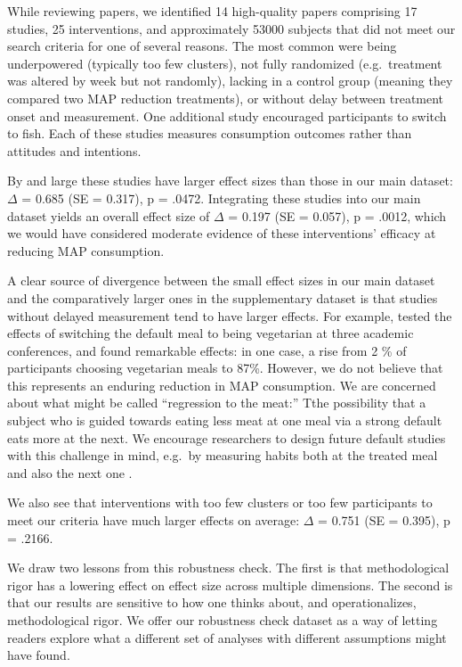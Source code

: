 \documentclass[sn-nature,referee,pdflatex]{sn-jnl}
\begin{document}
While reviewing papers, we identified 14 high-quality papers comprising
17 studies, 25 interventions, and approximately 53000 subjects that did
not meet our search criteria for one of several reasons. The most common
were being underpowered (typically too few clusters), not fully
randomized (e.g.~treatment was altered by week but not randomly),
lacking in a control group (meaning they compared two MAP reduction
treatments), or without delay between treatment onset and measurement.
One additional study encouraged participants to switch to fish. Each of
these studies measures consumption outcomes rather than attitudes and
intentions.

By and large these studies have larger effect sizes than those in our
main dataset: \(\Delta\) = 0.685 (SE = 0.317), p = .0472. Integrating
these studies into our main dataset yields an overall effect size of
\(\Delta\) = 0.197 (SE = 0.057), p = .0012, which we would have
considered moderate evidence of these interventions' efficacy at
reducing MAP consumption.

A clear source of divergence between the small effect sizes in our main
dataset and the comparatively larger ones in the supplementary dataset
is that studies without delayed measurement tend to have larger effects.
For example, \citep{hansen2021} tested the effects of switching the
default meal to being vegetarian at three academic conferences, and
found remarkable effects: in one case, a rise from 2 \% of participants
choosing vegetarian meals to 87\%. However, we do not believe that this
represents an enduring reduction in MAP consumption. We are concerned
about what might be called ``regression to the meat:'' Tthe possibility
that a subject who is guided towards eating less meat at one meal via a
strong default eats more at the next. We encourage researchers to design
future default studies with this challenge in mind, e.g.~by measuring
habits both at the treated meal and also the next one
\citep{vocski2024}.

We also see that interventions with too few clusters or too few
participants to meet our criteria have much larger effects on average:
\(\Delta\) = 0.751 (SE = 0.395), p = .2166.

We draw two lessons from this robustness check. The first is that
methodological rigor has a lowering effect on effect size across
multiple dimensions. The second is that our results are sensitive to how
one thinks about, and operationalizes, methodological rigor. We offer
our robustness check dataset as a way of letting readers explore what a
different set of analyses with different assumptions might have found.
\end{document}
